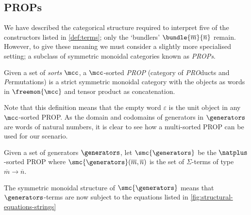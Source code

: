 \subsection{PROPs}

We have described the categorical structure required to interpret five of the
constructors listed in \cref{def:terms}; only the `bundlers'
\(\bundle{\overline{m}}{\overline{n}}\) remain.
However, to give these meaning we must consider a slightly more specialised
setting; a subclass of symmetric monoidal categories known as \emph{PROPs}.

\begin{definition}
    Given a set of \emph{sorts} \(\mcc\), a \(\mcc\)-sorted \emph{PROP}
    (category of \emph{PRO}ducts and \emph{P}ermutations) is a strict symmetric
    monoidal category with the objects as words in \(\freemon{\mcc}\) and tensor
    product as concatenation.
\end{definition}

Note that this definition means that the empty word \(\varepsilon\) is the unit
object in any \(\mcc\)-sorted PROP.
As the domain and codomains of generators in \(\generators\) are words of
natural numbers, it is clear to see how a multi-sorted PROP can be used for our
scenario.

\begin{definition}\label{def:freely-generated-prop}
    Given a set of generators \(\generators\), let \(\smc{\generators}\) be the
    \(\natplus\)-sorted PROP where \(
        \smc{\generators}(\overline{m}, \overline{n})
    \) is the set of \(\Sigma\)-terms of type \(\overline{m} \to \overline{n}\).
\end{definition}

The symmetric monoidal structure of \(\smc{\generators}\) means that
\(\generators\)-terms are now subject to the equations listed in
\cref{fig:structural-equations-strings}

